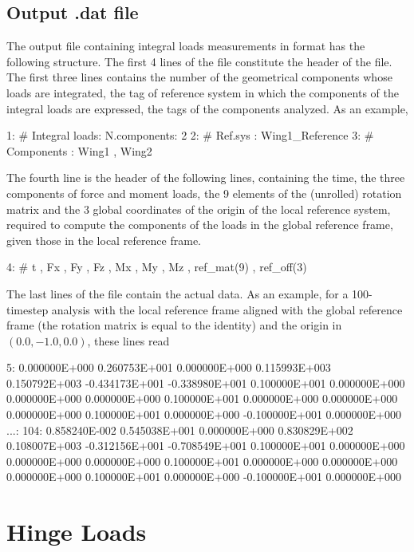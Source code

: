\subsection{Output .dat file}
The output file containing integral loads measurements in  format has 
the following structure.
The first 4 lines of the file constitute the header of the file. The first three 
lines contains the number of the geometrical components  whose loads 
are integrated, the tag of reference system in which the components of the integral 
loads are expressed, the tags of the  components analyzed. As an example,
\begin{inputfile}
  1:  # Integral loads: N.components: 2
  2:  #                 Ref.sys     : Wing1_Reference
  3:  #                 Components  : Wing1 , Wing2
\end{inputfile}
The fourth line is the header of the following lines, containing the time, 
the three components of force and moment loads, the 9 elements of the (unrolled) 
rotation matrix and the 3 global coordinates of the origin of the local reference 
system, required to compute the components of the loads in the global reference 
frame, given those in the local reference frame.
\begin{inputfile}
  4:  #  t , Fx , Fy , Fz , Mx , My , Mz , ref_mat(9) , ref_off(3) 
\end{inputfile}
The last lines of the file contain the actual data. As an example, for a 
100-timestep analysis with the local reference frame  
aligned with the global reference frame (the rotation matrix is equal to the identity) 
and the origin in $(0.0,-1.0,0.0)$, these lines read
\begin{inputfile}
  5: 0.000000E+000  0.260753E+001  0.000000E+000  0.115993E+003
     0.150792E+003 -0.434173E+001 -0.338980E+001  0.100000E+001
     0.000000E+000  0.000000E+000  0.000000E+000  0.100000E+001
     0.000000E+000  0.000000E+000  0.000000E+000  0.100000E+001
     0.000000E+000 -0.100000E+001  0.000000E+000
...:
104: 0.858240E-002  0.545038E+001  0.000000E+000  0.830829E+002
     0.108007E+003 -0.312156E+001 -0.708549E+001  0.100000E+001
     0.000000E+000  0.000000E+000  0.000000E+000  0.100000E+001
     0.000000E+000  0.000000E+000  0.000000E+000  0.100000E+001
     0.000000E+000 -0.100000E+001  0.000000E+000
\end{inputfile}

\section{Hinge Loads}

